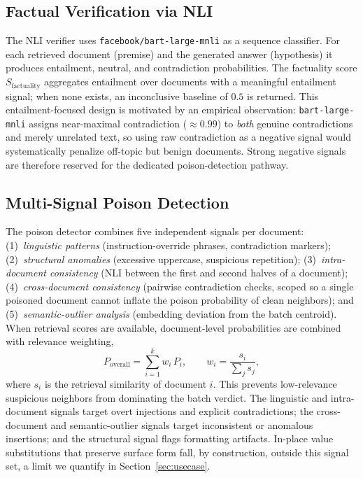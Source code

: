 
\subsection{Factual Verification via NLI}
The NLI verifier uses \texttt{facebook/bart-large-mnli} as a sequence classifier. For each retrieved document (premise) and the generated answer (hypothesis) it produces entailment, neutral, and contradiction probabilities. The factuality score $S_{\text{factuality}}$ aggregates entailment over documents with a meaningful entailment signal; when none exists, an inconclusive baseline of $0.5$ is returned. This entailment-focused design is motivated by an empirical observation: \texttt{bart-large-mnli} assigns near-maximal contradiction ($\approx0.99$) to \emph{both} genuine contradictions and merely unrelated text, so using raw contradiction as a negative signal would systematically penalize off-topic but benign documents. Strong negative signals are therefore reserved for the dedicated poison-detection pathway.

\subsection{Multi-Signal Poison Detection}
The poison detector combines five independent signals per document: (1)~\emph{linguistic patterns} (instruction-override phrases, contradiction markers); (2)~\emph{structural anomalies} (excessive uppercase, suspicious repetition); (3)~\emph{intra-document consistency} (NLI between the first and second halves of a document); (4)~\emph{cross-document consistency} (pairwise contradiction checks, scoped so a single poisoned document cannot inflate the poison probability of clean neighbors); and (5)~\emph{semantic-outlier analysis} (embedding deviation from the batch centroid). When retrieval scores are available, document-level probabilities are combined with relevance weighting,
\begin{equation}
P_{\text{overall}} = \sum_{i=1}^{k} w_i\,P_i, \qquad w_i = \frac{s_i}{\sum_j s_j},
\end{equation}
where $s_i$ is the retrieval similarity of document $i$. This prevents low-relevance suspicious neighbors from dominating the batch verdict. The linguistic and intra-document signals target overt injections and explicit contradictions; the cross-document and semantic-outlier signals target inconsistent or anomalous insertions; and the structural signal flags formatting artifacts. In-place value substitutions that preserve surface form fall, by construction, outside this signal set, a limit we quantify in Section~\ref{sec:usecase}.

